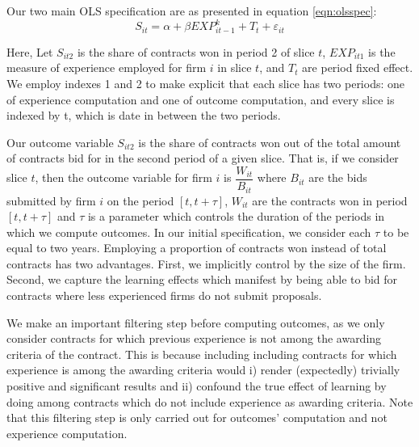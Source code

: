 Our two main OLS specification are as presented in equation \ref{eqn:olsspec}:
\begin{equation}
\label{eqn:olsspec}
S_{it}=\alpha+ \beta EXP^k_{it-1}+T_t+\varepsilon_{it}
\end{equation}

Here, Let $S_{it2}$ is the share of contracts won in period 2 of slice $t$, $EXP_{it1} $ is the measure of experience employed for firm $i$ in slice $t$, and $T_t$ are period fixed effect. We employ indexes 1 and 2 to make explicit that each slice has two periods: one of experience computation and one of outcome computation, and every slice is indexed by t, which is date in between the two periods.

Our outcome variable $S_{it2}$ is the share of contracts won out of the total amount of contracts bid for in the second period of a given slice. That is, if we consider slice $t$, then the outcome variable for firm $i$ is $\dfrac{W_{it}}{B_{it}}$ where $B_{it}$ are the bids submitted by firm $i$ on the period $[t,t+\tau]$, $W_{it}$ are the contracts won in period $[t,t+\tau]$ and $\tau$ is a parameter which controls the duration of the periods in which we compute outcomes. In our initial specification, we consider each $\tau$ to be equal to two years. Employing a proportion of contracts won instead of total contracts has two advantages. First, we implicitly control by the size of the firm. Second, we capture the learning effects which manifest by being able to bid for contracts where less experienced firms do not submit proposals.

We make an important filtering step before computing outcomes, as we only consider contracts for which previous experience is not among the awarding criteria of the contract. This is because including including contracts for which experience is among the awarding criteria would i) render (expectedly) trivially positive and significant results and ii) confound the true effect of learning by doing among contracts which do not include experience as awarding criteria. Note that this filtering step is only carried out for outcomes' computation and not experience computation.


